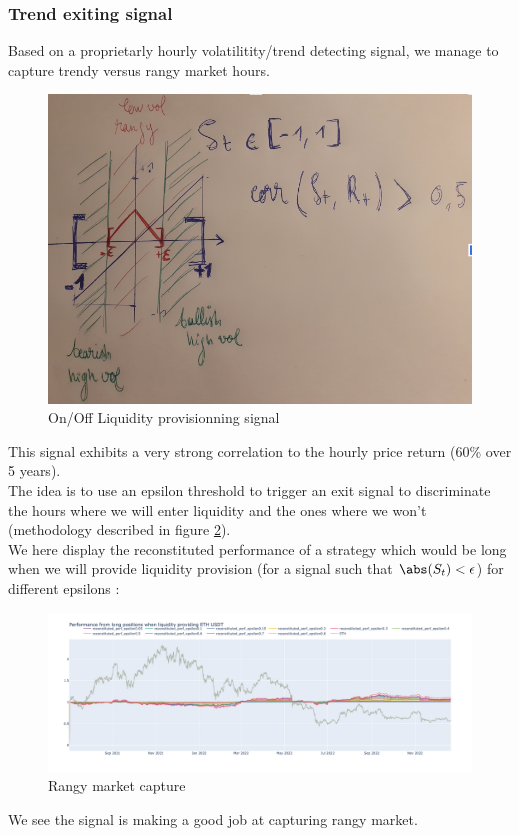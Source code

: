 \documentclass[conference]{IEEEtran}
\begin{document}
\subsubsection{Trend exiting signal}
Based on a proprietarly hourly volatilitity/trend detecting signal, we manage to capture trendy versus rangy market hours.\\
\begin{figure}[h!]
    \centering
    \includegraphics[scale=0.5]{Plots/signal_hourly.png}
    \caption{On/Off Liquidity provisionning signal}
    \label{fig:signal_hourly}
\end{figure}
This signal exhibits a very strong correlation to the hourly price return (60\% over 5 years).\\
The idea is to use an epsilon threshold to trigger an exit signal to discriminate the hours where we will enter liquidity and the ones where we won't (methodology described in figure \ref{fig:signal_hourly}).\\
We here display the reconstituted performance of a strategy which would be long when we will provide liquidity provision (for a signal such that $\abs(S_t)<\epsilon$) for different epsilons :
\begin{figure}[h!]
    \centering
    \includegraphics[scale=0.15]{Plots/signal_ETH.png}
    \caption{Rangy market capture}
    \label{fig:signal_hourly}
\end{figure}
We see the signal is making a good job at capturing rangy market.\\
\end{document}
